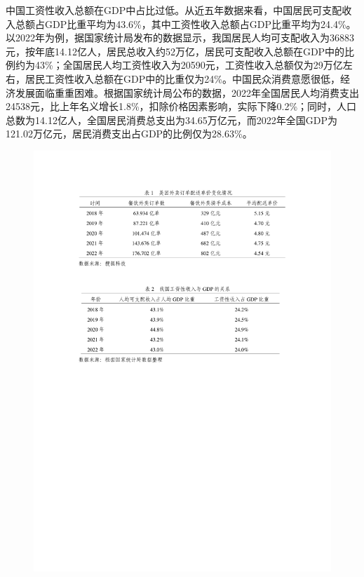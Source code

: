 \documentclass[12pt,twoside,utf8]{ctexart}
\begin{document}
中国工资性收入总额在GDP中占比过低。从近五年数据来看，中国居民可支配收入总额占GDP比重平均为43.6\%，其中工资性收入总额占GDP比重平均为24.4\%。以2022年为例，据国家统计局发布的数据显示，我国居民人均可支配收入为36883元，按年底14.12亿人，居民总收入约52万亿，居民可支配收入总额在GDP中的比例约为43\%；全国居民人均工资性收入为20590元，工资性收入总额仅为29万亿左右，居民工资性收入总额在GDP中的比重仅为24\%。中国民众消费意愿很低，经济发展面临重重困难。根据国家统计局公布的数据，2022年全国居民人均消费支出24538元，比上年名义增长1.8\%，扣除价格因素影响，实际下降0.2\%；同时，人口总数为14.12亿人，全国居民消费总支出为34.65万亿元，而2022年全国GDP为121.02万亿元，居民消费支出占GDP的比例仅为28.63\%。

\begin{figure}[hbt!]
\centering
\includegraphics[width=1\linewidth]{t2.pdf}
\label{fig:map}
\end{figure}
\end{document}

